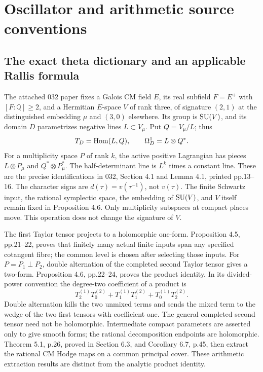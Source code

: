 \documentclass[11pt]{article}
\newcommand{\Q}{\mathbb Q}\newcommand{\C}{\mathbb C}\newcommand{\Z}{\mathbb Z}\newcommand{\R}{\mathbb R}\newcommand{\A}{\mathbb A}\newcommand{\OO}{\mathcal O}
\theoremstyle{definition}\newtheorem{definition}[theorem]{Definition}\newtheorem{remark}[theorem]{Remark}
\begin{document}
\section{Oscillator and arithmetic source conventions}


\subsection{The exact theta dictionary and an applicable Rallis formula}

The attached 032 paper fixes a Galois CM field $E$, its real subfield
$F=E^+$ with $[F:\Q]\geq2$, and a Hermitian $E$-space $V$ of rank three,
of signature $(2,1)$ at the distinguished embedding $\mu$ and $(3,0)$
elsewhere. Its group is $\operatorname{SU}(V)$, and its domain $D$ parametrizes negative
lines $L\subset V_\mu$. Put $Q=V_\mu/L$; thus
\[
 T_D=\operatorname{Hom}(L,Q),\qquad \Omega_D^1=L\otimes Q^*.
\]
For a multiplicity space $P$ of rank $k$, the active positive Lagrangian
has pieces $L\otimes P_\mu$ and $Q^*\otimes P_\mu^*$. The half-determinant
line is $L^k$ times a constant line. These are the precise identifications
in 032, Section 4.1 and Lemma 4.1, printed pp.13--16. The character signs
are $d(\tau)=v(\tau^{-1})$, not $v(\tau)$. The finite Schwartz input, the
rational symplectic space, the embedding of $\operatorname{SU}(V)$, and $V$ itself remain
fixed in Proposition 4.6. Only multiplicity subspaces at compact places
move. This operation does not change the signature of $V$.

The first Taylor tensor projects to a holomorphic one-form. Proposition
4.5, pp.21--22, proves that finitely many actual finite inputs span any
specified cotangent fibre; the common level is chosen after selecting
those inputs. For $P=P_1\perp P_2$, double alternation of the completed
second Taylor tensor gives a two-form. Proposition 4.6, pp.22--24, proves
the product identity. In its divided-power convention the degree-two
coefficient of a product is
\[
 T_2^{(1)}T_0^{(2)}+T_1^{(1)}T_1^{(2)}+T_0^{(1)}T_2^{(2)}.
\]
Double alternation kills the two unmixed terms and sends the mixed term
to the wedge of the two first tensors with coefficient one. The general
completed second tensor need not be holomorphic. Intermediate compact
parameters are asserted only to give smooth forms; the rational
decomposition endpoints are holomorphic. Theorem 5.1, p.26, proved in
Section 6.3, and Corollary 6.7, p.45, then extract the rational CM Hodge
maps on a common principal cover. These arithmetic extraction results
are distinct from the analytic product identity.
\end{document}
